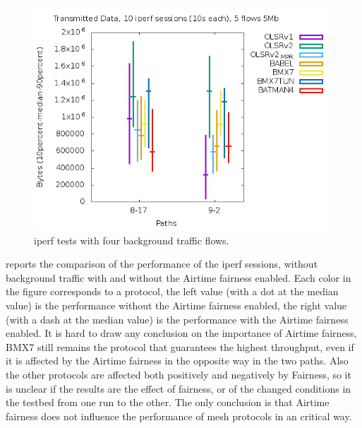 \documentclass[10pt,onecolumn]{paper}
\begin{document}
\begin{figure}[!htb]
  \centering
    \includegraphics[width=.9\linewidth]{images/failure_test_iperf_10runs-IPv6-twoflow.png}
    \caption{iperf tests with four background traffic flows.}
  \label{fig:iperffourflows}
\end{figure}

 reports the comparison of the performance of the iperf
sessions, without background traffic with and without the Airtime fairness
enabled. Each color in the figure corresponds to a protocol, the left value
(with a dot at the median value) is the performance without the Airtime fairness
enabled, the right value (with a dash at the median value) is the performance
with the Airtime fairness enabled. It is hard to draw any conclusion on the
importance of Airtime fairness, BMX7 still remains the protocol that guarantees
the highest throughput, even if it is affected by the Airtime fairness in the
opposite way in the two paths. Also the other protocols are affected both positively
and negatively by Fairness, so it is unclear if the results are the effect of
fairness, or of the changed conditions in the testbed from one run to the other.
The only conclusion is that Airtime fairness does not influence the performance
of mesh protocols in an critical way. 
\end{document}
